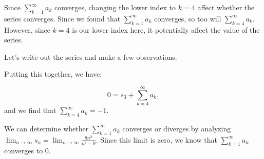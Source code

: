 \documentclass{ximera}
\begin{document}
\begin{example}
\begin{question}
\begin{explanation}
Since $\sum_{k=1}^{\infty} a_k$ converges, changing the lower index to $k=4$   affect whether the series converges.  Since we found that $\sum_{k=1}^{\infty} a_k$ converges, so too will $\sum_{k=4}^{\infty} a_k$.  However, since $k=4$ is our lower index here, it  potentially affect the value of the series.

Let's write out the series and make a few observations.



  
 Putting this together, we have:
 
 \[
 0 = s_3 + \sum_{k=4}^{\infty} a_k,
 \] 
 and we find that $ \sum_{k=4}^{\infty} a_k = -1$. 

We can determine whether $\sum_{k=1}^{\infty} a_k$ converges or diverges by analyzing $\lim_{n \to \infty} s_n = \lim_{n \to \infty} \frac{8n^2}{n^4-9}$.  Since this limit is zero, we know that $\sum_{k=1}^{\infty} a_k$ converges to $0$.
\end{explanation}
\end{question}

\end{example}
\end{document}
